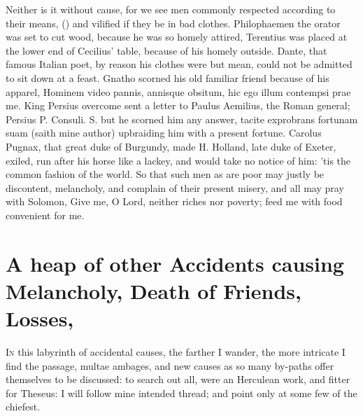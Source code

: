 {Neither is it without cause, for we see men commonly respected
according to their means, () and vilified if they be in bad clothes. Philophaemen the
orator was set to cut wood, because he was so homely attired,
Terentius was placed at the lower end of Cecilius' table, because
of his homely outside.  Dante, that famous Italian poet, by
reason his clothes were but mean, could not be admitted to sit down at
a feast. Gnatho scorned his old familiar friend because of his apparel,
Hominem video pannis, annisque obsitum, hic ego illum contempsi
prae me. King Persius overcome sent a letter to Paulus Aemilius,
the Roman general; Persius P. Consuli. S. but he scorned him any
answer, tacite exprobrans fortunam suam (saith mine author) upbraiding
him with a present fortune. Carolus Pugnax, that great duke of
Burgundy, made H. Holland, late duke of Exeter, exiled, run after his
horse like a lackey, and would take no notice of him:  'tis the
common fashion of the world. So that such men as are poor may justly be
discontent, melancholy, and complain of their present misery, and all
may pray with Solomon, Give me, O Lord, neither riches nor
poverty; feed me with food convenient for me.

\section[Accidents, Death of Friends, Losses]{A heap of other Accidents causing Melancholy, Death of Friends, Losses, \etc{}}\label{sec:accidents-death-of-friends}

\lettrine{I}{n} this labyrinth of accidental causes, the farther I wander, the more
intricate I find the passage, multae ambages, and new causes as so many
by-paths offer themselves to be discussed: to search out all, were an
Herculean work, and fitter for Theseus: I will follow mine intended
thread; and point only at some few of the chiefest.
}
